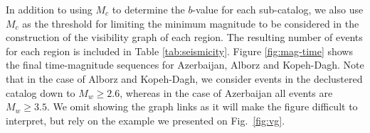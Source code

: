 In addition to using $M_c$ to determine the $b$-value for each sub-catalog, we also use $M_c$ as the threshold for limiting the minimum magnitude to be considered in the construction of the visibility graph of each region. The resulting number of events for each region is included in Table \ref{tab:seismicity}. Figure \ref{fig:mag-time} shows the final time-magnitude sequences for Azerbaijan, Alborz and Kopeh-Dagh. Note that in the case of Alborz and Kopeh-Dagh, we consider events in the declustered catalog down to $M_w \geq 2.6$, whereas in the case of Azerbaijan all events are $M_w \geq 3.5$. We omit showing the graph links as it will make the figure difficult to interpret, but rely on the example we presented on Fig.~\ref{fig:vg}.


